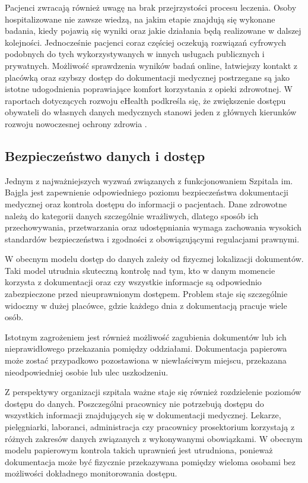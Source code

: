 Pacjenci zwracają również uwagę na brak przejrzystości procesu leczenia. Osoby hospitalizowane nie zawsze wiedzą, na jakim etapie znajdują się wykonane badania, kiedy pojawią się wyniki oraz jakie działania będą realizowane w dalszej kolejności.
Jednocześnie pacjenci coraz częściej oczekują rozwiązań cyfrowych podobnych do tych wykorzystywanych w innych usługach publicznych i prywatnych. Możliwość sprawdzenia wyników badań online, łatwiejszy kontakt z placówką oraz szybszy dostęp do dokumentacji medycznej postrzegane są jako istotne udogodnienia poprawiające komfort korzystania z opieki zdrowotnej. W raportach dotyczących rozwoju eHealth podkreśla się, że zwiększenie dostępu obywateli do własnych danych medycznych stanowi jeden z głównych kierunków rozwoju nowoczesnej ochrony zdrowia \cite{EU_eHealth_2024}.
\subsection{Bezpieczeństwo danych i dostęp}
Jednym z najważniejszych wyzwań związanych z funkcjonowaniem Szpitala im. Bajgla jest zapewnienie odpowiedniego poziomu bezpieczeństwa dokumentacji medycznej oraz kontrola dostępu do informacji o pacjentach. Dane zdrowotne należą do kategorii danych szczególnie wrażliwych, dlatego sposób ich przechowywania, przetwarzania oraz udostępniania wymaga zachowania wysokich standardów bezpieczeństwa i zgodności z obowiązującymi regulacjami prawnymi.

W obecnym modelu dostęp do danych zależy od fizycznej lokalizacji dokumentów. Taki model utrudnia skuteczną kontrolę nad tym, kto w danym momencie korzysta z dokumentacji oraz czy wszystkie informacje są odpowiednio zabezpieczone przed nieuprawnionym dostępem. Problem staje się szczególnie widoczny w dużej placówce, gdzie każdego dnia z dokumentacją pracuje wiele osób.

Istotnym zagrożeniem jest również możliwość zagubienia dokumentów lub ich nieprawidłowego przekazania pomiędzy oddziałami. Dokumentacja papierowa może zostać przypadkowo pozostawiona w niewłaściwym miejscu, przekazana nieodpowiedniej osobie lub ulec uszkodzeniu.

Z perspektywy organizacji szpitala ważne staje się również rozdzielenie poziomów dostępu do danych. Poszczególni pracownicy nie potrzebują dostępu do wszystkich informacji znajdujących się w dokumentacji medycznej. Lekarze, pielęgniarki, laboranci, administracja czy pracownicy prosektorium korzystają z różnych zakresów danych związanych z wykonywanymi obowiązkami. W obecnym modelu papierowym kontrola takich uprawnień jest utrudniona, ponieważ dokumentacja może być fizycznie przekazywana pomiędzy wieloma osobami bez możliwości dokładnego monitorowania dostępu.

